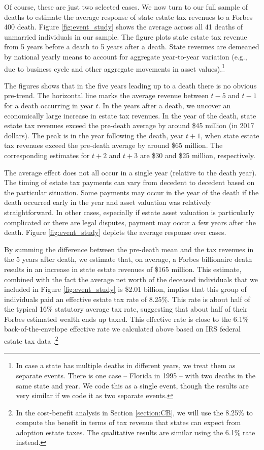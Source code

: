 \documentclass[12pt]{article}
\begin{document}
Of course, these are just two selected cases. We now turn to our full sample of deaths to estimate the average response of state estate tax revenues to a Forbes 400 death. Figure \ref{fig:event_study} shows the average across all 41 deaths of unmarried individuals in our sample. The figure plots state estate tax revenue from 5 years before a death to 5 years after a death. State revenues are demeaned by national yearly means to account for aggregate year-to-year variation (e.g., due to business cycle and other aggregate movements in asset values).\footnote{In case a state has multiple deaths in different years, we treat them as separate events. There is one case -- Florida in 1995 -- with two deaths in the same state and year. We code this as a single event, though the results are very similar if we code it as two separate events.}

The figures shows that in the five years leading up to a death there is no obvious pre-trend. The horizontal line marks the average revenue between $t-5$ and $t-1$ for a death occurring in year $t$. In the years after a death, we uncover an economically large increase in estate tax revenues. In the year of the death,  state estate tax revenues exceed the pre-death average by around \$45 million (in 2017 dollars).
The peak is in the year following the death, year $t+1$, when state estate tax revenues exceed the pre-death average by around \$65 million. The corresponding estimates for $t+2$ and $t+3$ are \$30 and \$25 million, respectively. 

The average effect does not all occur in a single year (relative to the death year). The timing of estate tax payments can vary from decedent to decedent based on the particular situation. Some payments may occur in the year of the death if the death occurred early in the year and asset valuation was relatively straightforward. In other cases, especially if estate asset valuation is particularly complicated or there are legal disputes, payment may occur a few years after the death. Figure \ref{fig:event_study} depicts the average response over cases.

By summing the difference between the pre-death mean and the tax revenues in the 5 years after death,  we estimate that, on average, a Forbes billionaire death results in an increase in state estate revenues of \$165 million. This estimate, combined with the fact the average net worth of the deceased individuals that we included in Figure \ref{fig:event_study} is \$2.01 billion, implies that this group of individuals paid an effective estate tax rate of 8.25\%. This rate is about half of the typical 16\% statutory average tax rate, suggesting that about half of their Forbes estimated wealth ends up taxed.
This effective rate is close to the 6.1\% back-of-the-envelope effective rate we calculated above based on IRS federal estate tax data \citep{raub2010comparison}.\footnote{In the cost-benefit analysis in Section \ref{section:CB}, we will use the 8.25\% to compute the benefit in terms of tax revenue that states can expect from adoption estate taxes. The qualitative results are similar using the 6.1\% rate instead.}
\end{document}
